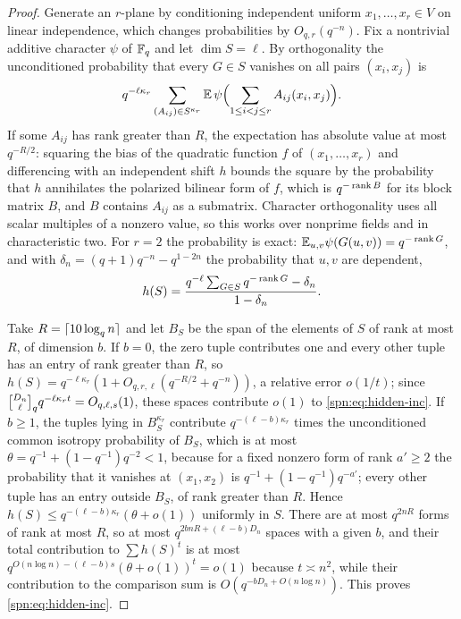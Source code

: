 \begin{proof}
Generate an $r$-plane by conditioning independent uniform $x_1,\dots,x_r\in V$ on linear
independence, which changes probabilities by $O_{q,r}(q^{-n})$. Fix a nontrivial additive character
$\psi$ of $\mathbb{F}_q$ and let $\dim S=\ell$. By orthogonality the unconditioned probability that every
$G\in S$ vanishes on all pairs $(x_i,x_j)$ is
\[
 q^{-\ell\kappa_r}\sum_{(A_{ij})\in S^{\kappa_r}}\mathbb{E}\,\psi\Bigl(\sum_{1\le i<j\le r}A_{ij}(x_i,x_j)\Bigr).
\]
If some $A_{ij}$ has rank greater than $R$, the expectation has absolute value at most $q^{-R/2}$:
squaring the bias of the quadratic function $f$ of $(x_1,\dots,x_r)$ and differencing with an
independent shift $h$ bounds the square by the probability that $h$ annihilates the polarized
bilinear form of $f$, which is $q^{-\operatorname{rank} B}$ for its block matrix $B$, and $B$ contains $A_{ij}$
as a submatrix. Character orthogonality uses all scalar multiples of a nonzero value, so this works
over nonprime fields and in characteristic two. For $r=2$ the probability is exact:
$\mathbb{E}_{u,v}\psi(G(u,v))=q^{-\operatorname{rank} G}$, and with $\delta_n=(q+1)q^{-n}-q^{1-2n}$ the probability that
$u,v$ are dependent,
\[
 h(S)=\frac{q^{-\ell}\sum_{G\in S}q^{-\operatorname{rank} G}-\delta_n}{1-\delta_n}.
\]

Take $R=\lceil10\log_qn\rceil$ and let $B_S$ be the span of the elements of $S$ of rank at most $R$, of
dimension $b$. If $b=0$, the zero tuple contributes one and every other tuple has an entry of rank
greater than $R$, so $h(S)=q^{-\ell\kappa_r}(1+O_{q,r,\ell}(q^{-R/2}+q^{-n}))$, a relative error
$o(1/t)$; since $\spnqbin{D_n}{\ell}{q}q^{-\ell\kappa_rt}=O_{q,\ell,s}(1)$, these spaces contribute
$o(1)$ to \eqref{spn:eq:hidden-inc}. If $b\ge1$, the tuples lying in $B_S^{\kappa_r}$ contribute
$q^{-(\ell-b)\kappa_r}$ times the unconditioned common isotropy probability of $B_S$, which is at most
$\theta=q^{-1}+(1-q^{-1})q^{-2}<1$, because for a fixed nonzero form of rank $a'\ge2$ the probability
that it vanishes at $(x_1,x_2)$ is $q^{-1}+(1-q^{-1})q^{-a'}$; every other tuple has an entry outside
$B_S$, of rank greater than $R$. Hence $h(S)\le q^{-(\ell-b)\kappa_r}(\theta+o(1))$ uniformly in $S$.
There are at most $q^{2nR}$ forms of rank at most $R$, so at most $q^{2bnR+(\ell-b)D_n}$ spaces with
a given $b$, and their total contribution to $\sum h(S)^t$ is at most
$q^{O(n\log n)-(\ell-b)s}(\theta+o(1))^t=o(1)$ because $t\asymp n^2$, while their contribution to the
comparison sum is $O(q^{-bD_n+O(n\log n)})$. This proves \eqref{spn:eq:hidden-inc}.


\end{proof}
